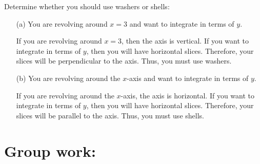 \documentclass[noinstructornotes]{ximera}
\begin{document}
	\begin{problem}
Determine whether you should use washers or shells:
\begin{itemize}

	\item[(a)] You are revolving around $x=3$ and want to integrate in terms of $y$.

	\begin{freeResponse}
	If you are revolving around $x=3$, then the axis is vertical.  If you want to integrate in terms of $y$, then you will have horizontal slices.  Therefore, your slices will be perpendicular to the axis.  Thus, you must use washers.
	\end{freeResponse}
	
	\item[(b)] You are revolving around the $x$-axis and want to integrate in terms of $y$.

	\begin{freeResponse}
	If you are revolving around the $x$-axis, the axis is horizontal.  If you want to integrate in terms of $y$, then you will have horizontal slices.  Therefore, your slices will be parallel to the axis.  Thus, you must use shells.
	\end{freeResponse}

\end{itemize}


\end{problem}
	
\begin{instructorNotes}

\end{instructorNotes}








\section{Group work:}
\end{document}

